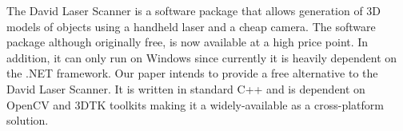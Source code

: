 
The David Laser Scanner \cite{winkelbach:2006} is a software package that
allows generation of 3D models of objects using a handheld laser and a cheap
camera. The software package although originally free, is now available at a
high price point. In addition, it can only run on Windows since currently it
is heavily dependent on the .NET framework. Our paper intends to provide a
free alternative to the David Laser Scanner. It is written in standard C++ and
is dependent on OpenCV and \ac{3DTK} toolkits \cite{3dtk:2012} making it a
widely-available as a cross-platform solution.
